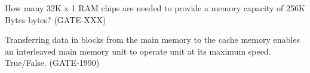 


\begin{questyle}

  \question  How many 32K x 1 RAM chips are needed to provide a memory capacity of 256K Bytes bytes? (GATE-XXX)

  \begin{oneparchoices}
  \end{oneparchoices}

\end{questyle}



\begin{questyle}

  \question  Transferring data in blocks from the main memory to the cache memory enables an interleaved main memory unit to operate unit at its maximum speed. True/False. (GATE-1990)

\end{questyle}


\begin{comment}

\begin{questyle}

  \question  (GATE-XXX)

  \begin{choices}
    \choice XXX
    \choice XXX
    \choice XXX
    \choice XXX
  \end{choices}

\end{questyle}


\end{comment}


\begin{comment}

  \begin{lstlisting}     \end{lstlisting}

  \begin{enumerate}
      \item[I]
      \item[II]
   \end{enumerate}

    \(  \mathbf{    } \)          {\huge \(    \) }               {\large \( \mathbf {  } \) }

     p_{n-1}       \sum_{n=1}^{n} s_i     \forall i, s_i

    \qquad \  \; \:

\end{comment}

